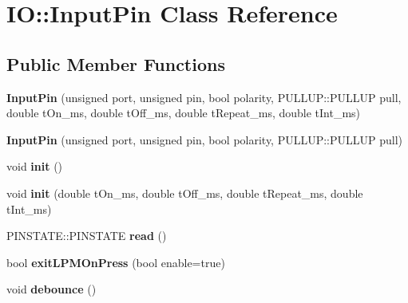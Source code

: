 \hypertarget{class_i_o_1_1_input_pin}{}\section{IO\+:\+:Input\+Pin Class Reference}
\label{class_i_o_1_1_input_pin}
\subsection*{Public Member Functions}
\begin{DoxyCompactItemize}
\item 
\mbox{\label{class_i_o_1_1_input_pin_a92eb2e3c1578c9b243d7197e7f5d40d4}} 
{\bfseries Input\+Pin} (unsigned port, unsigned pin, bool polarity, P\+U\+L\+L\+U\+P\+::\+P\+U\+L\+L\+UP pull, double t\+On\+\_\+ms, double t\+Off\+\_\+ms, double t\+Repeat\+\_\+ms, double t\+Int\+\_\+ms)
\item 
\mbox{\label{class_i_o_1_1_input_pin_a4bdd4c51a8fbc2afcb698b6683f09bce}} 
{\bfseries Input\+Pin} (unsigned port, unsigned pin, bool polarity, P\+U\+L\+L\+U\+P\+::\+P\+U\+L\+L\+UP pull)
\item 
\mbox{\label{class_i_o_1_1_input_pin_ae4f5f85de79c0a35854d63bb9ca9c313}} 
void {\bfseries init} ()
\item 
\mbox{\label{class_i_o_1_1_input_pin_a61d3798da6633c48d3e12e9bcbe88d68}} 
void {\bfseries init} (double t\+On\+\_\+ms, double t\+Off\+\_\+ms, double t\+Repeat\+\_\+ms, double t\+Int\+\_\+ms)
\item 
\mbox{\label{class_i_o_1_1_input_pin_a4deb336acc4e1497dd41a367be7d500f}} 
P\+I\+N\+S\+T\+A\+T\+E\+::\+P\+I\+N\+S\+T\+A\+TE {\bfseries read} ()
\item 
\mbox{\label{class_i_o_1_1_input_pin_a8f07c16a514f3a287f1cf3061a366cd4}} 
bool {\bfseries exit\+L\+P\+M\+On\+Press} (bool enable=true)
\item 
\mbox{\label{class_i_o_1_1_input_pin_a76953460629bd25dd0d8ca8ed24adb81}} 
void {\bfseries debounce} ()
\end{DoxyCompactItemize}
